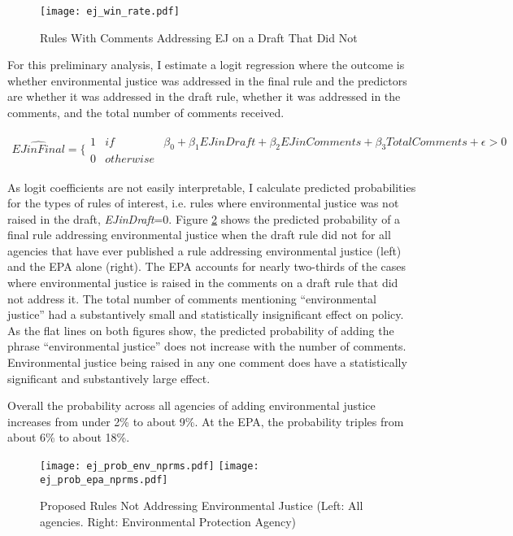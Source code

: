 \begin{figure}[h!]
\caption{Rules With Comments Addressing EJ on a Draft That Did Not}
\centering
\texttt{[image: ej\_win\_rate.pdf]}
\label{ejwinrate}
\end{figure}


For this preliminary analysis, I estimate a logit regression where the outcome is whether environmental justice was addressed in the final rule and the predictors are whether it was addressed in the draft rule, whether it was addressed in the comments, and the total number of comments received. 

\begin{align*}
  \hat{EJ in Final} = \Bigg\{ \begin{array}{lll}
    1 & if &  \beta_0 + \beta_1 EJ in Draft + \beta_2 EJ in Comments + \beta_3 Total Comments  + \epsilon > 0\\
0 & otherwise &  
  \end{array}
\end{align*}

As logit coefficients are not easily interpretable, I calculate predicted probabilities for the types of rules of interest, i.e. rules where environmental justice was not raised in the draft, \textit{EJinDraft}=0. Figure \ref{ejpredicted} shows the predicted probability of a final rule addressing environmental justice when the draft rule did not for all agencies that have ever published a rule addressing environmental justice (left) and the EPA alone (right). The EPA accounts for nearly two-thirds of the cases where environmental justice is raised in the comments on a draft rule that did not address it. The total number of comments mentioning ``environmental justice'' had a substantively small and statistically insignificant effect on policy. As the flat lines on both figures show, the predicted probability of adding the phrase ``environmental justice'' does not increase with the number of comments. Environmental justice being raised in any one comment does have a statistically significant and substantively large effect. 

Overall the probability across all agencies of adding environmental justice increases from under 2\% to about 9\%. At the EPA, the probability triples from about 6\% to about 18\%. 


\begin{figure}[h!]
\caption{Proposed Rules Not Addressing Environmental Justice (Left: All agencies. Right: Environmental Protection Agency)}
\centering
\noindent
\texttt{[image: ej\_prob\_env\_nprms.pdf]}
\texttt{[image: ej\_prob\_epa\_nprms.pdf]}
\label{ejpredicted}
\end{figure}

